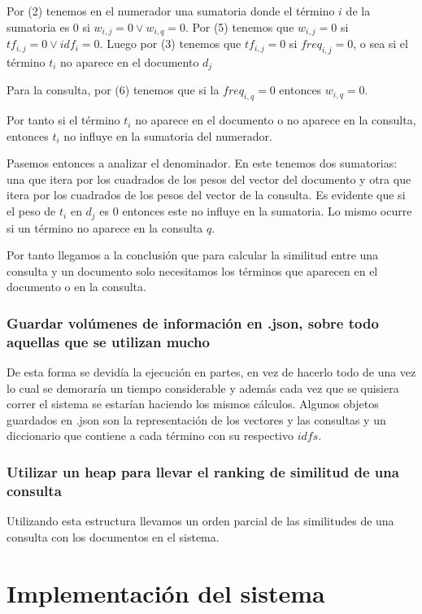 \documentclass[runningheads]{llncs}
\begin{document}
	Por (2) tenemos en el numerador una sumatoria donde el t\'ermino $i$ de la sumatoria es 0 si $w_{i,j}=0 \lor w_{i,q}=0$. Por (5) tenemos que $w_{i,j}=0$ si $tf_{i,j}=0 \lor idf_i=0$. Luego por (3) tenemos que $tf_{i,j}=0$ si $freq_{i,j}=0$, o sea si el t\'ermino $t_i$ no aparece en el documento $d_j$
	
	Para la consulta, por (6) tenemos que si la $freq_{i,q}=0$ entonces $w_{i,q}=0$.
	
	Por tanto si el t\'ermino $t_i$ no aparece en el documento o no aparece en la consulta, entonces $t_i$ no influye en la sumatoria del numerador.
	
	Pasemos entonces a analizar el denominador. En este tenemos dos sumatorias: una que itera por los cuadrados de los pesos del vector del documento y otra que itera por los cuadrados de los pesos del vector de la consulta. Es evidente que si el peso de $t_i$ en $d_j$ es 0 entonces este no influye en la sumatoria. Lo mismo ocurre si un t\'ermino no aparece en la consulta $q$.
	
	Por tanto llegamos a la conclusi\'on que para calcular la similitud entre una consulta y un documento solo necesitamos los t\'erminos que aparecen en el documento o en la consulta.
	
	 \subsubsection{Guardar volúmenes de informaci\'on en .json, sobre todo aquellas que se utilizan mucho} De esta forma se devid\'ia la ejecuci\'on en partes, en vez de hacerlo todo de una vez lo cual se demorar\'ia un tiempo considerable y adem\'as cada vez que se quisiera correr el sistema se estar\'ian haciendo los mismos c\'alculos. Algunos objetos guardados en .json son la representaci\'on de los vectores y las consultas y un diccionario que contiene a cada t\'ermino con su respectivo $idfs$.
	
	\subsubsection{Utilizar un heap para llevar el ranking de similitud de una consulta} Utilizando esta estructura llevamos un orden parcial de las similitudes de una consulta con los documentos en el sistema.
		
	\section{Implementaci\'on del sistema}
	
\end{document}
